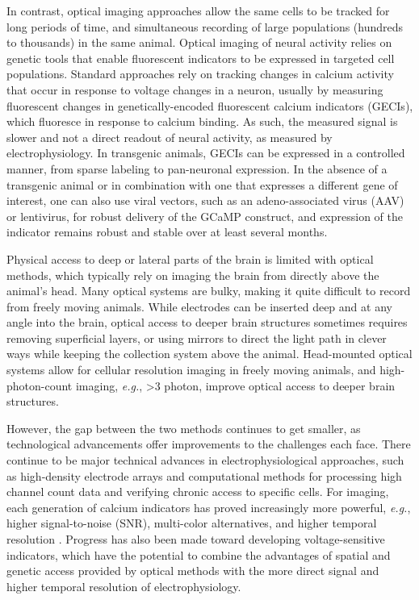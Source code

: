 In contrast, optical imaging approaches allow the same cells to be tracked for long periods of time, and simultaneous recording of large populations (hundreds to thousands) in the same animal. Optical imaging of neural activity relies on genetic tools that enable fluorescent indicators to be expressed in targeted cell populations. Standard approaches rely on tracking changes in calcium activity that occur in response to voltage changes in a neuron, usually by measuring fluorescent changes in genetically-encoded fluorescent calcium indicators (GECIs)\cite{Akerboom2012, Chen2013UltrasensitiveActivity}, which fluoresce in response to calcium binding. As such, the measured signal is slower and not a direct readout of neural activity, as measured by electrophysiology. In transgenic animals, GECIs can be expressed in a controlled manner, from sparse labeling\cite{Dana2014} to pan-neuronal expression\cite{Daigle2018}. In the absence of a transgenic animal or in combination with one that expresses a different gene of interest, one can also use viral vectors, such as an adeno-associated virus (AAV) or lentivirus, for robust delivery of the GCaMP construct, and expression of the indicator remains robust and stable over at least several months.

Physical access to deep or lateral parts of the brain is limited with optical methods, which typically rely on imaging the brain from directly above the animal's head. Many optical systems are bulky, making it quite difficult to record from freely moving animals. While electrodes can be inserted deep and at any angle into the brain, optical access to deeper brain structures sometimes requires removing superficial layers, or using mirrors to direct the light path in clever ways while keeping the collection system above the animal\cite{Andermann2013}. Head-mounted optical systems allow for cellular resolution imaging in freely moving animals\cite{Helmchen2001, Sawinski2009, Zong2017}, and high-photon-count imaging, \textit{e.g.}, >3 photon\cite{Klioutchnikov2020}, improve optical access to deeper brain structures.

However, the gap between the two methods continues to get smaller, as technological advancements offer improvements to the challenges each face. There continue to be major technical advances in electrophysiological approaches, such as high-density electrode arrays\cite{REFREF} and computational methods for processing high channel count data and verifying chronic access to specific cells\cite{REFREF}. For imaging, each generation of calcium indicators has proved increasingly more powerful, \textit{e.g.}, higher signal-to-noise (SNR), multi-color alternatives, and higher temporal resolution \cite{Akerboom2012OptimizationImaging, Chen2013UltrasensitiveActivity}. Progress has also been made toward developing voltage-sensitive indicators\cite{Bando2019, Villette2019}, which have the potential to combine the advantages of spatial and genetic access provided by optical methods with the more direct signal and higher temporal resolution of electrophysiology.

